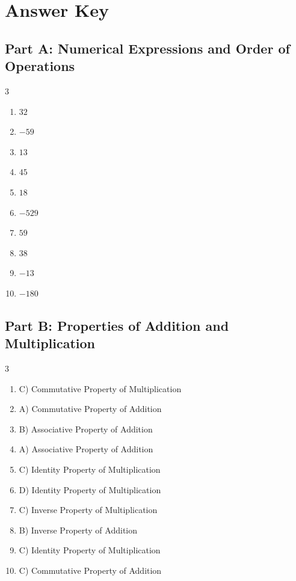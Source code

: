 \documentclass[11pt]{article}
\begin{document}
\newpage
{}
\section*{Answer Key}
\subsection*{Part A: Numerical Expressions and Order of Operations}
\begin{multicols}{3}
\begin{enumerate}
  \item $32$
  \item $-59$
  \item $13$
  \item $45$
  \item $18$
  \item $-529$
  \item $59$
  \item $38$
  \item $-13$
  \item $-180$
\end{enumerate}
\end{multicols}
\subsection*{Part B: Properties of Addition and Multiplication}
\begin{multicols}{3}
\begin{enumerate}
  \item C) Commutative Property of Multiplication
  \item A) Commutative Property of Addition
  \item B) Associative Property of Addition
  \item A) Associative Property of Addition
  \item C) Identity Property of Multiplication
  \item D) Identity Property of Multiplication
  \item C) Inverse Property of Multiplication
  \item B) Inverse Property of Addition
  \item C) Identity Property of Multiplication
  \item C) Commutative Property of Addition
\end{enumerate}
\end{multicols}
\end{document}
